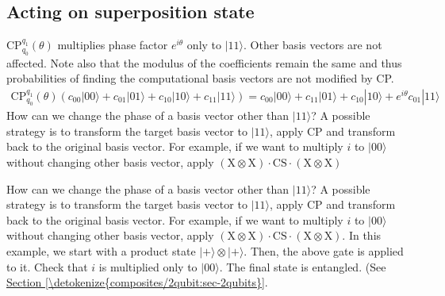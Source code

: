 \documentclass[letterpaper,10pt,english]{jupyterBook}
\begin{document}
\subsection{Acting on superposition state}
\label{\detokenize{q2gates/cp:acting-on-superposition-state}}
\sphinxAtStartPar
CP\(_{q_0}^{q_1}(\theta)\) multiplies phase factor \(e^{i\theta}\) only to \(|11\rangle\).  Other basis vectors are not affected.  Note also that the modulus of the coefficients remain the same and thus probabilities of finding the computational basis vectors are not modified by CP.
\begin{equation*}
\begin{split}
\text{CP}_{q_0}^{q_1} (\theta) \left (c_{00} |00\rangle + c_{01} |01\rangle + c_{10} |10\rangle + c_{11} |11\rangle \right ) =
c_{00} |00\rangle + c_{11} |01\rangle + c_{10} |10\rangle + e^{i \theta} c_{01} |11\rangle
\end{split}
\end{equation*}
\sphinxAtStartPar
How can we change the phase of a basis vector other than \(|11\rangle\)?  A possible strategy is to transform the target basis vector to \(|11\rangle\), apply CP and transform back to the original basis vector.  For example, if we want to multiply \(i\) to \(|00\rangle\) without changing other basis vector, apply \((\text{X} \otimes \text{X}) \cdot \text{CS} \cdot (\text{X} \otimes \text{X})\)

\sphinxAtStartPar
{}How can we change the phase of a basis vector other than \(|11\rangle\)?  A possible strategy is to transform the target basis vector to \(|11\rangle\), apply CP and transform back to the original basis vector.  For example, if we want to multiply \(i\) to \(|00\rangle\) without changing other basis vector, apply \((\text{X} \otimes \text{X}) \cdot \text{CS} \cdot (\text{X} \otimes \text{X})\).  In this example, we start with a product state \(|+\rangle \otimes |+\rangle\).  Then, the above gate is applied to it.  Check that \(i\) is multiplied only to  \(|00\rangle\).  The final state is entangled. (See \hyperref[\detokenize{composites/2qubit:sec-2qubits}]{Section \ref{\detokenize{composites/2qubit:sec-2qubits}}}.
\end{document}
